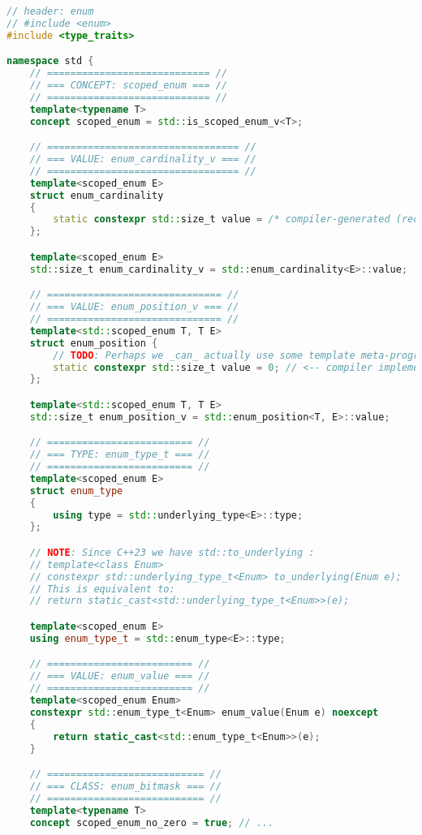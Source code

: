\documentclass[
  format=manuscript,
  screen=true,
  review=false,
  nonacm=true,
  timestamp=true,
  balance=false]{acmart}
\begin{document}
\begin{lstlisting}[language=Cpp]
// header: enum
// #include <enum>
#include <type_traits>

namespace std {
    // ============================ //
    // === CONCEPT: scoped_enum === //
    // ============================ //
    template<typename T>
    concept scoped_enum = std::is_scoped_enum_v<T>;

    // ================================= //
    // === VALUE: enum_cardinality_v === //
    // ================================= //
    template<scoped_enum E>
    struct enum_cardinality
    {
        static constexpr std::size_t value = /* compiler-generated (recursive) magic here */ 1;
    };

    template<scoped_enum E>
    std::size_t enum_cardinality_v = std::enum_cardinality<E>::value;

    // ============================== //
    // === VALUE: enum_position_v === //
    // ============================== //
    template<std::scoped_enum T, T E>
    struct enum_position {
        // TODO: Perhaps we _can_ actually use some template meta-programming to do this?
        static constexpr std::size_t value = 0; // <-- compiler implements this
    };

    template<std::scoped_enum T, T E>
    std::size_t enum_position_v = std::enum_position<T, E>::value;

    // ========================= //
    // === TYPE: enum_type_t === //
    // ========================= //
    template<scoped_enum E>
    struct enum_type
    {
        using type = std::underlying_type<E>::type;
    };

    // NOTE: Since C++23 we have std::to_underlying :
    // template<class Enum>
    // constexpr std::underlying_type_t<Enum> to_underlying(Enum e);
    // This is equivalent to:
    // return static_cast<std::underlying_type_t<Enum>>(e);

    template<scoped_enum E>
    using enum_type_t = std::enum_type<E>::type;

    // ========================= //
    // === VALUE: enum_value === //
    // ========================= //
    template<scoped_enum Enum>
    constexpr std::enum_type_t<Enum> enum_value(Enum e) noexcept
    {
        return static_cast<std::enum_type_t<Enum>>(e);
    }

    // =========================== //
    // === CLASS: enum_bitmask === //
    // =========================== //
    template<typename T>
    concept scoped_enum_no_zero = true; // ...


\end{lstlisting}
\end{document}
